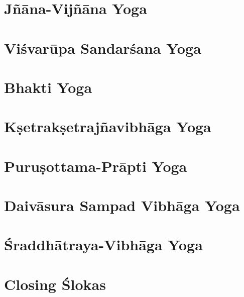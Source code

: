 \documentclass{scrbook}
\begin{document}
\chapter{Jñāna-Vijñāna Yoga}
\begin{multicols}{2}
    
\end{multicols}

\setcounter{chapter}{10}

\chapter{Viśvarūpa Sandarśana Yoga}
\begin{multicols}{2}
    
\end{multicols}

\chapter{Bhakti Yoga}
\begin{multicols}{2}
    
\end{multicols}

\chapter{Kṣetrakṣetrajñavibhāga Yoga}
\begin{multicols}{2}
    
\end{multicols}

\setcounter{chapter}{14}

\chapter{Puruṣottama-Prāpti Yoga}
\begin{multicols}{2}
    
\end{multicols}

\chapter{Daivāsura Sampad Vibhāga Yoga}
\begin{multicols}{2}
    
\end{multicols}

\chapter{Śraddhātraya-Vibhāga Yoga}
\begin{multicols}{2}
    
\end{multicols}

\backmatter
\chapter{Closing Ślokas}

\end{document}
